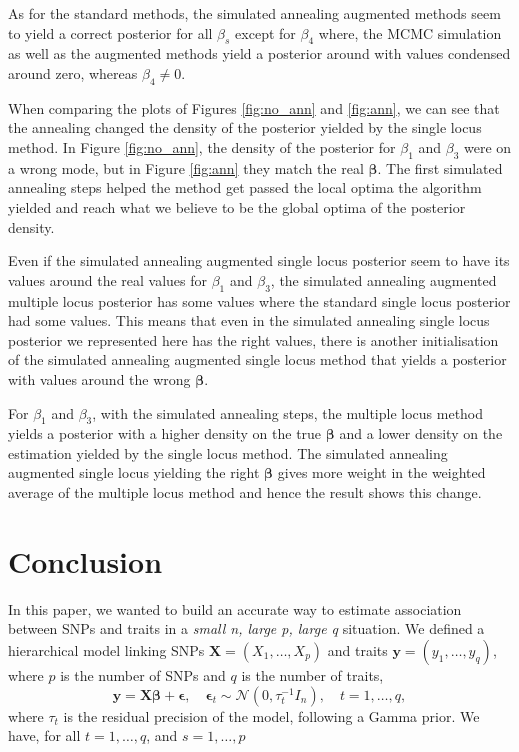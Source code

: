 \documentclass[a4paper, 11pt]{report}
\numberwithin{equation}{chapter}
\begin{document}
As for the standard methods, the simulated annealing augmented methods seem to yield a correct posterior for all $\beta_s$ except for $\beta_4$ where, the MCMC simulation as well as the augmented methods yield a posterior around with values condensed around zero, whereas $\beta_4 \neq 0$.

When comparing the plots of Figures \ref{fig:no_ann} and \ref{fig:ann}, we can see that the annealing changed the density of the posterior yielded by the single locus method. In Figure \ref{fig:no_ann}, the density of the posterior for $\beta_1$ and $\beta_3$ were on a wrong mode, but in Figure \ref{fig:ann} they match the real $\boldsymbol{\beta}$. The first simulated annealing steps helped the method get passed the local optima the algorithm yielded and reach what we believe to be the global optima of the posterior density.

Even if the simulated annealing augmented single locus posterior seem to have its values around the real values for $\beta_1$ and $\beta_3$, the simulated annealing augmented multiple locus posterior has some values where the standard single locus posterior had some values. This  means that even in the simulated annealing single locus posterior we represented here has the right values, there is another initialisation of the simulated annealing augmented single locus method that yields a posterior with values around the wrong $\boldsymbol{\beta}$.

For $\beta_1$ and $\beta_3$, with the simulated annealing steps, the multiple locus method yields a posterior with a higher density on the true $\boldsymbol{\beta}$ and a lower density on the estimation yielded by the single locus method. The simulated annealing augmented single locus yielding the right $\boldsymbol{\beta}$ gives more weight in the weighted average of the multiple locus method and hence the result shows this change.
%
%
%
%
%
%
\newpage
\chapter{Conclusion}
In this paper, we wanted to build an accurate way to estimate association between SNPs and traits in a \textit{small n, large p, large q} situation. We defined a hierarchical model linking SNPs $\boldsymbol{X} = (X_1,\dots,X_p)$ and traits $\boldsymbol{y} = (y_1, \dots, y_q)$, where $p$ is the number of SNPs and $q$ is the number of traits,
$$
\boldsymbol{y} = \boldsymbol{X\beta} + \boldsymbol{\epsilon},\quad \boldsymbol{\epsilon}_t \sim \mathcal{N}\left(0,\tau_t^{-1}I_n\right), \quad t=1,\dots,q,
$$
where $\tau_t$ is the residual precision of the model, following a Gamma prior. We have, for all $t = 1,\dots, q$, and $s=1,\dots,p$
\end{document}
